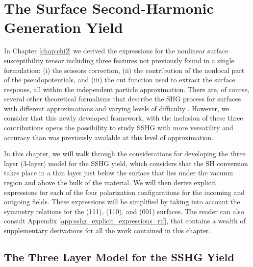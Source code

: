 \chapter{The Surface Second-Harmonic Generation Yield}\label{chap:sshgyield}
\partialtoc

In Chapter \ref{chap:chi2} we derived the expressions for the nonlinear surface
susceptibility tensor including three features not previously found in a single
formulation: (i) the scissors correction, (ii) the contribution of the nonlocal
part of the pseudopotentials, and (iii) the cut function used to extract the
surface response, all within the independent particle approximation. There are,
of course, several other theoretical formalisms that describe the SHG process
for surfaces with different approximations and varying levels of difficulty
\cite{levinePRB94, mendozaPRL98, arzatePRB01, mendozaPRB01, mejiaPRB02,
sanoPRB02, mejiaRMF04, trollePRB14}. However, we consider that this newly
developed framework, with the inclusion of these three contributions opens the
possibility to study SSHG with more versatility and accuracy than was previously
available at this level of approximation.

In this chapter, we will walk through the considerations for developing the
three layer (3-layer) model for the SSHG yield, which considers that the SH
conversion takes place in a thin layer just below the surface that lies under
the vacuum region and above the bulk of the material. We will then derive
explicit expressions for each of the four polarization configurations for the
incoming and outgoing fields. These expressions will be simplified by taking
into account the symmetry relations for the (111), (110), and (001) surfaces.
The reader can also consult Appendix \ref{app:sshg_explicit_expressions_rif},
that contains a wealth of supplementary derivations for all the work contained
in this chapter.



\section{The Three Layer Model for the SSHG Yield}\label{sec:3layersshg}


